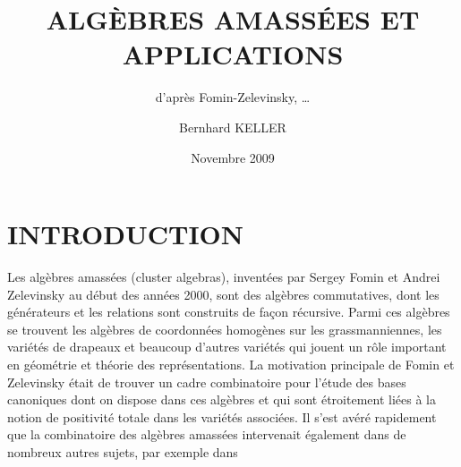 \documentclass[brochure,12pt]{bourbaki}
\date{Novembre 2009}
\title{ALG\`EBRES AMASS\'EES ET APPLICATIONS}
\subtitle{d'apr\`es Fomin-Zelevinsky, \ldots}
\author{Bernhard KELLER}
\newcommand{\og}{\guillemotleft\hspace*{1pt}}
\newcommand{\fg}{\hspace*{1pt}\guillemotright}
\numberwithin{equation}{subsection}
\numberwithin{theorem}{section}
\begin{document}
\maketitle




\section*{INTRODUCTION}
Les alg\`ebres amass\'ees (cluster algebras), invent\'ees \cite{FominZelevinsky02} par
Sergey Fomin et Andrei Zelevinsky au d\'ebut des ann\'ees 2000,
sont des alg\`ebres commutatives, dont les g\'en\'erateurs
et les relations sont construits de fa\c{c}on r\'ecursive.
Parmi ces alg\`ebres se trouvent les alg\`ebres de coordonn\'ees homog\`enes
sur les grassmanniennes, les vari\'et\'es de drapeaux et
beaucoup d'autres vari\'et\'es qui jouent un r\^ole important en g\'eom\'etrie
et th\'eorie des repr\'esentations. La motivation principale de
Fomin et Zelevinsky \'etait de trouver un cadre combinatoire
pour l'\'etude des bases canoniques dont on dispose
\cite{Kashiwara90} \cite{Lusztig90} dans ces alg\`ebres
et qui sont \'etroitement li\'ees \`a
la notion de positivit\'e totale \cite{Lusztig96}
dans les vari\'et\'es associ\'ees.
Il s'est
av\'er\'e rapidement que la combinatoire des alg\`ebres amass\'ees
intervenait \'egalement dans de nombreux autres sujets, par exemple
dans
\end{document}
